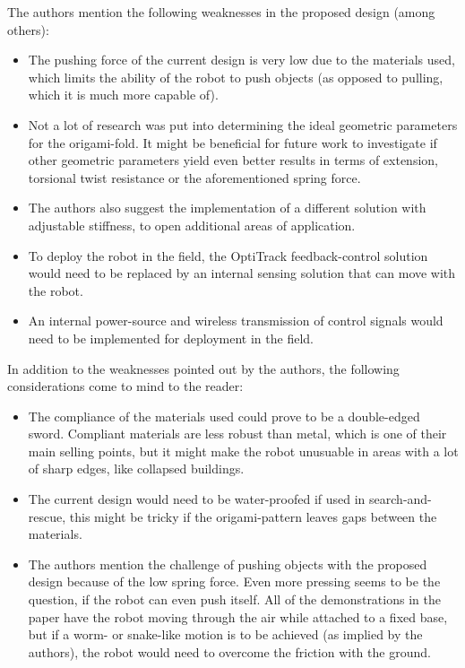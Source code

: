 The authors mention the following weaknesses in the proposed design (among others):

\begin{itemize}
    \item The pushing force of the current design is very low due to the materials used, which limits the ability of the robot to push objects (as opposed to pulling, which it is much more capable of).
    \item Not a lot of research was put into determining the ideal geometric parameters for the origami-fold. It might be beneficial for future work to investigate if other geometric parameters yield even better results in terms of extension, torsional twist resistance or the aforementioned spring force.
    \item The authors also suggest the implementation of a different solution with adjustable stiffness, to open additional areas of application.
    \item To deploy the robot in the field, the OptiTrack feedback-control solution would need to be replaced by an internal sensing solution that can move with the robot.
    \item An internal power-source and wireless transmission of control signals would need to be implemented for deployment in the field.
\end{itemize}

In addition to the weaknesses pointed out by the authors, the following considerations come to mind to the reader:

\begin{itemize}
    \item The compliance of the materials used could prove to be a double-edged sword. Compliant materials are less robust than metal, which is one of their main selling points, but it might make the robot unusuable in areas with a lot of sharp edges, like collapsed buildings.
    \item The current design would need to be water-proofed if used in search-and-rescue, this might be tricky if the origami-pattern leaves gaps between the materials.
    \item The authors mention the challenge of pushing objects with the proposed design because of the low spring force. Even more pressing seems to be the question, if the robot can even push itself. All of the demonstrations in the paper have the robot moving through the air while attached to a fixed base, but if a worm- or snake-like motion is to be achieved (as implied by the authors), the robot would need to overcome the friction with the ground.
\end{itemize}

